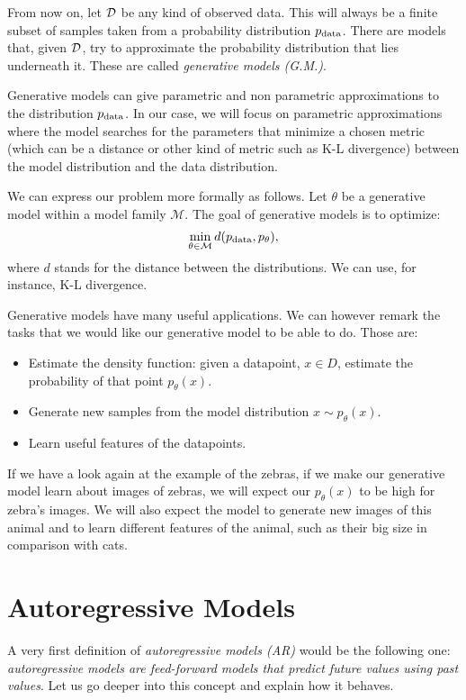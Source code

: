 From now on, let $\mathcal{D}$ be any kind of observed data. This will always be a finite subset of samples taken from a probability distribution $p_{\text{data}}$. There are models that, given $\mathcal{D}$, try to approximate the 
probability distribution that lies underneath it. These are called \emph{generative models (G.M.)}. 

Generative models can give parametric and non parametric approximations to the distribution $p_{\text{data}}$. 
In our case, we will focus on parametric approximations where the model searches for the parameters that minimize a chosen metric (which can be a distance or other kind of metric such as K-L divergence) between the model distribution and the data distribution. 

We can express our problem more formally as follows. Let $\theta$ be a generative model within a model family $\mathcal M$. The goal of generative models is to optimize:
$$
\min_{\theta \in \mathcal M} d(p_{\text{data}},p_\theta),
$$
where $d$ stands for the distance between the distributions. We can use, for instance, K-L divergence.

Generative models have many useful applications. We can however remark the tasks that we would like our generative model to be able to do. Those are:
\begin{itemize}
\item Estimate the density function: given a datapoint, $x \in D$, estimate the probability of that point $p_\theta(x)$.
\item Generate new samples from the model distribution $x \sim p_\theta(x)$.
\item Learn useful features of the datapoints.
\end{itemize}

If we have a look again at the example of the zebras, if we make our generative model learn about images of zebras, we will expect our $p_\theta(x)$ to be high for zebra's images. We will also expect the model
to generate new images of this animal and to learn different features of the animal, such as their big size in comparison with cats.

\section{Autoregressive Models}

A very first definition of \emph{autoregressive models (AR)} would be the following one: \emph{autoregressive models are feed-forward models that predict future values using past values}. Let us go deeper into this 
concept and explain how it behaves.

